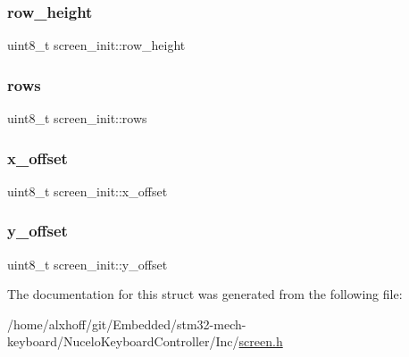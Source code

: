 \subsubsection{\texorpdfstring{row\+\_\+height}{row\_height}}
{\footnotesize\ttfamily uint8\+\_\+t screen\+\_\+init\+::row\+\_\+height}

\mbox{\label{structscreen__init_a9d91f1f08461c2137dfeca5f443ba809}} 
\subsubsection{\texorpdfstring{rows}{rows}}
{\footnotesize\ttfamily uint8\+\_\+t screen\+\_\+init\+::rows}

\mbox{\label{structscreen__init_a2fdbfee48fc2d925b08ced850ee5771d}} 
\subsubsection{\texorpdfstring{x\+\_\+offset}{x\_offset}}
{\footnotesize\ttfamily uint8\+\_\+t screen\+\_\+init\+::x\+\_\+offset}

\mbox{\label{structscreen__init_a12f08370536e8e5dfe7fdaa0f47817e7}} 
\subsubsection{\texorpdfstring{y\+\_\+offset}{y\_offset}}
{\footnotesize\ttfamily uint8\+\_\+t screen\+\_\+init\+::y\+\_\+offset}



The documentation for this struct was generated from the following file\+:\begin{DoxyCompactItemize}
\item 
/home/alxhoff/git/\+Embedded/stm32-\/mech-\/keyboard/\+Nucelo\+Keyboard\+Controller/\+Inc/\hyperlink{screen_8h}{screen.\+h}\end{DoxyCompactItemize}
